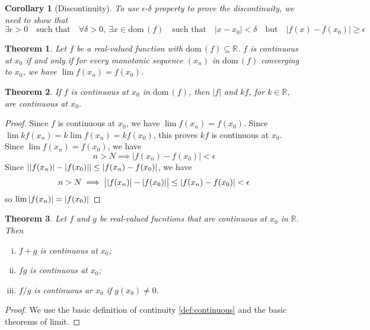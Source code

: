 \documentclass[12pt, lettersize]{book}
\theoremstyle{plain}
\newtheorem{thm}{Theorem}[section]
\newtheorem{cor}{Corollary}[thm]
\theoremstyle{definition}
\theoremstyle{remark}
\newcommand{\R}{\mathbb{R}}
\newcommand{\dom}{\text{dom}\,}
\begin{document}
			\begin{cor}[Discontinuity]
			To use $\epsilon\text{-}\delta$ property to prove the discontinuity, we need to show that
			\begin{displaymath}
				\exists\epsilon>0\quad\text{such that}\quad\forall\delta>0,\ \exists x\in\dom(f)\quad\text{such that}\quad |x-x_0|<\delta\quad\text{but}\quad|f(x)-f(x_0)|\geq\epsilon
			\end{displaymath}
			\end{cor}
			
			\begin{thm}
			Let $f$ be a real-valued function with $\dom(f)\subseteq\R$. $f$ is continuous at $x_0$ if and only if for every monotonic sequence $(x_n)$ in $\dom(f)$ converging to $x_0$, we have $\lim f(x_n)=f(x_0)$.
			\end{thm}
			
			\begin{thm}\label{def:17.3}
			If $f$ is continuous at $x_0$ in $\dom(f)$, then $|f|$ and $kf$, for $k\in\R$, are continuous at $x_0$.
			\end{thm}
			\begin{proof}
			Since $f$ is continuous at $x_0$, we have $\lim f(x_n)=f(x_0)$. Since $\lim kf(x_n)=k\lim f(x_n)=kf(x_0)$, this
			proves $kf$ is continuous at $x_0$.
			Since $\lim f(x_n)=f(x_0)$, we have 
			\begin{displaymath}
				n>N\implies|f(x_n)-f(x_0)|<\epsilon
			\end{displaymath}
			Since $\abs{\abs{f(x_n)}-\abs{f(x_0)}}\leq\abs{f(x_n)-f(x_0)}$, we have 
			\begin{displaymath}
				n>N\implies\big|\abs{f(x_n)}-\abs{f(x_0)}\big|\leq\abs{f(x_n)-f(x_0)}<\epsilon
			\end{displaymath}
			so $\lim \abs{f(x_n)}=\abs{f(x_0)}$
			\end{proof}
			
			\begin{thm}\label{def:17.4}
			Let $f$ and $g$ be real-valued fucntions that are continuous at $x_0$ in $\R$. Then
			\begin{enumerate}[(i)]
				\item $f+g$ is continuous at $x_0$;
				\item $fg$ is continuous at $x_0$;
				\item $f/g$ is continuous ar $x_0$ if $g(x_0)\neq0$.
			\end{enumerate}
			\end{thm}
			\begin{proof}
			We use the basic definition of continuity \ref{def:continuous} and the basic theorems of limit.
			\end{proof}
			
\end{document}
